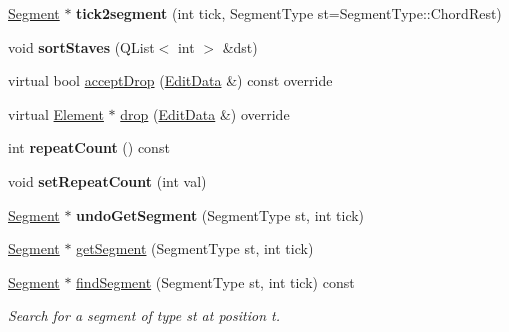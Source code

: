 \begin{DoxyCompactItemize}
\mbox{\label{class_ms_1_1_measure_a190f9a66f83973403eb5276383255b0d}} 
\hyperlink{class_ms_1_1_segment}{Segment} $\ast$ {\bfseries tick2segment} (int tick, Segment\+Type st=Segment\+Type\+::\+Chord\+Rest)
\item 
\mbox{\label{class_ms_1_1_measure_a99ffffdf436829bfd4583b59bd7f8dd6}} 
void {\bfseries sort\+Staves} (Q\+List$<$ int $>$ \&dst)
\item 
virtual bool \hyperlink{class_ms_1_1_measure_a5964d737ffa873b7772cbf81e0092987}{accept\+Drop} (\hyperlink{class_ms_1_1_edit_data}{Edit\+Data} \&) const override
\item 
virtual \hyperlink{class_ms_1_1_element}{Element} $\ast$ \hyperlink{class_ms_1_1_measure_ab1083a3a6e0ac7cd35a27d9d71829560}{drop} (\hyperlink{class_ms_1_1_edit_data}{Edit\+Data} \&) override
\item 
\mbox{\label{class_ms_1_1_measure_adb00eda58072bd4fc267e0a581ed3216}} 
int {\bfseries repeat\+Count} () const
\item 
\mbox{\label{class_ms_1_1_measure_a4913911db820f64c25ad1ae7266b5a83}} 
void {\bfseries set\+Repeat\+Count} (int val)
\item 
\mbox{\label{class_ms_1_1_measure_ae7038c38cc0f39a97579ed2a50849dfb}} 
\hyperlink{class_ms_1_1_segment}{Segment} $\ast$ {\bfseries undo\+Get\+Segment} (Segment\+Type st, int tick)
\item 
\hyperlink{class_ms_1_1_segment}{Segment} $\ast$ \hyperlink{class_ms_1_1_measure_a4fe8e5a83c238d686df4930a59ad6861}{get\+Segment} (Segment\+Type st, int tick)
\item 
\mbox{\label{class_ms_1_1_measure_a52aebd01fd2288c2e10cd1544a0ceaad}} 
\hyperlink{class_ms_1_1_segment}{Segment} $\ast$ \hyperlink{class_ms_1_1_measure_a52aebd01fd2288c2e10cd1544a0ceaad}{find\+Segment} (Segment\+Type st, int tick) const
\begin{DoxyCompactList}\small\item\em Search for a segment of type {\itshape st} at position {\itshape t}. \end{DoxyCompactList}\item 
\mbox{\label{class_ms_1_1_measure_a05489da0af832c631333c31b13c1c040}} 

\end{DoxyCompactItemize}
